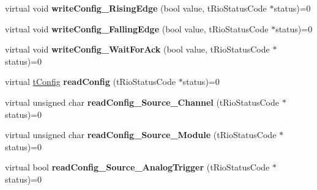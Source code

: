 \begin{DoxyCompactItemize}
\item 
\hypertarget{classnFPGA_1_1nFRC__2012__1__6__4_1_1tInterrupt_aef3a2b19251f7c46f32e2e4eb31c9787}{
virtual void {\bfseries writeConfig\_\-RisingEdge} (bool value, tRioStatusCode $\ast$status)=0}
\label{classnFPGA_1_1nFRC__2012__1__6__4_1_1tInterrupt_aef3a2b19251f7c46f32e2e4eb31c9787}

\item 
\hypertarget{classnFPGA_1_1nFRC__2012__1__6__4_1_1tInterrupt_a7edc214820cc2dcdb4797ca3b7406041}{
virtual void {\bfseries writeConfig\_\-FallingEdge} (bool value, tRioStatusCode $\ast$status)=0}
\label{classnFPGA_1_1nFRC__2012__1__6__4_1_1tInterrupt_a7edc214820cc2dcdb4797ca3b7406041}

\item 
\hypertarget{classnFPGA_1_1nFRC__2012__1__6__4_1_1tInterrupt_aeb90a300359697fbd41a15a098867219}{
virtual void {\bfseries writeConfig\_\-WaitForAck} (bool value, tRioStatusCode $\ast$status)=0}
\label{classnFPGA_1_1nFRC__2012__1__6__4_1_1tInterrupt_aeb90a300359697fbd41a15a098867219}

\item 
\hypertarget{classnFPGA_1_1nFRC__2012__1__6__4_1_1tInterrupt_afa6f12cce24068fd854ae536b6fdf292}{
virtual \hyperlink{unionnFPGA_1_1nFRC__2012__1__6__4_1_1tInterrupt_1_1tConfig}{tConfig} {\bfseries readConfig} (tRioStatusCode $\ast$status)=0}
\label{classnFPGA_1_1nFRC__2012__1__6__4_1_1tInterrupt_afa6f12cce24068fd854ae536b6fdf292}

\item 
\hypertarget{classnFPGA_1_1nFRC__2012__1__6__4_1_1tInterrupt_a80d66c555b620a14ece18d6f569c544a}{
virtual unsigned char {\bfseries readConfig\_\-Source\_\-Channel} (tRioStatusCode $\ast$status)=0}
\label{classnFPGA_1_1nFRC__2012__1__6__4_1_1tInterrupt_a80d66c555b620a14ece18d6f569c544a}

\item 
\hypertarget{classnFPGA_1_1nFRC__2012__1__6__4_1_1tInterrupt_a070d4eb3c8b3dcde8690a59f9c470efe}{
virtual unsigned char {\bfseries readConfig\_\-Source\_\-Module} (tRioStatusCode $\ast$status)=0}
\label{classnFPGA_1_1nFRC__2012__1__6__4_1_1tInterrupt_a070d4eb3c8b3dcde8690a59f9c470efe}

\item 
\hypertarget{classnFPGA_1_1nFRC__2012__1__6__4_1_1tInterrupt_adf63e24028897755b35c419c0f19b227}{
virtual bool {\bfseries readConfig\_\-Source\_\-AnalogTrigger} (tRioStatusCode $\ast$status)=0}
\label{classnFPGA_1_1nFRC__2012__1__6__4_1_1tInterrupt_adf63e24028897755b35c419c0f19b227}


\end{DoxyCompactItemize}
